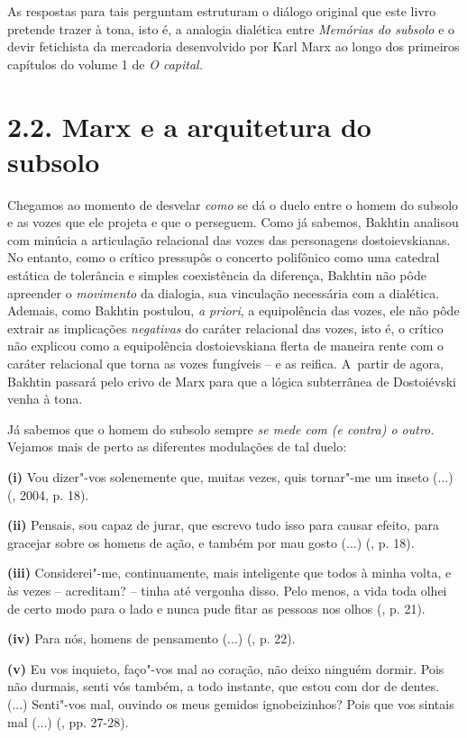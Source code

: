 {As respostas para tais perguntam estruturam o diálogo original que este
livro pretende trazer à tona, isto é, a analogia dialética entre
\emph{Memórias do subsolo} e o devir fetichista da mercadoria
desenvolvido por Karl Marx ao longo dos primeiros capítulos do volume 1
de \emph{O capital. }

\section{2.2. Marx e a arquitetura do subsolo}

Chegamos ao momento de desvelar \emph{como} se dá o duelo entre o homem
do subsolo e as vozes que ele projeta e que o perseguem. Como já
sabemos, Bakhtin analisou com minúcia a articulação relacional das vozes
das personagens dostoievskianas. No entanto, como o crítico pressupôs o
concerto polifônico como uma catedral estática de tolerância e simples
coexistência da diferença, Bakhtin não pôde apreender o \emph{movimento}
da dialogia, sua vinculação necessária com a dialética. Ademais, como
Bakhtin postulou, \emph{a priori}, a equipolência das vozes, ele não
pôde extrair as implicações \emph{negativas} do caráter relacional das
vozes, isto é, o crítico não explicou como a equipolência dostoievskiana
flerta de maneira rente com o caráter relacional que torna as vozes
fungíveis -- e as reifica. A~partir de agora, Bakhtin passará pelo crivo
de Marx para que a lógica subterrânea de Dostoiévski venha à tona.

Já sabemos que o homem do subsolo sempre \emph{se mede com (e contra) o
outro.} Vejamos mais de perto as diferentes modulações de tal duelo:

\textbf{(i)} Vou dizer"-vos solenemente que, muitas vezes, quis tornar"-me
um inseto (...) (, 2004, p. 18).

\textbf{(ii)} Pensais, sou capaz de jurar, que escrevo tudo isso para
causar efeito, para gracejar sobre os homens de ação, e também por mau
gosto (...) (, p. 18).

\textbf{(iii)} Considerei"-me, continuamente, mais inteligente que todos
à minha volta, e às vezes -- acreditam? -- tinha até vergonha disso.
Pelo menos, a vida toda olhei de certo modo para o lado e nunca pude
fitar as pessoas nos olhos (, p. 21).

\textbf{(iv)} Para nós, homens de pensamento (...) (, p. 22).

\textbf{(v)} Eu vos inquieto, faço"-vos mal ao coração, não deixo ninguém
dormir. Pois não durmais, senti vós também, a todo instante, que estou
com dor de dentes. (...) Senti"-vos mal, ouvindo os meus gemidos
ignobeizinhos? Pois que vos sintais mal (...) (, pp. 27-28).

}
